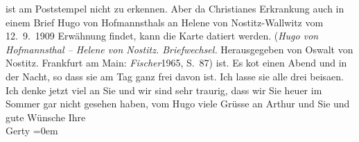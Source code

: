 \begin{ledgroupsized}[t]{13cm}
{{{                        ist am Poststempel nicht zu erkennen. Aber da Christianes Erkrankung auch in einem Brief Hugo von Hofmannsthals an Helene von Nostitz-Wallwitz vom
                            12. 9. 1909 Erwähnung findet, kann die Karte datiert
                        werden. (\emph{Hugo von Hofmannsthal – Helene von Nostitz.
                                Briefwechsel.} Herausgegeben von Oswalt von Nostitz.
                            Frankfurt am Main: \emph{Fischer}1965, S. 87)}}}\label{K_L01871_1h} ist. Es ko{\geminationm}t einen Abend und in der Nacht, so dass sie am
                    Tag ganz frei davon ist. Ich lasse sie alle drei beisa{\geminationm}en. Ich denke jetzt {\pb}viel an Sie und wir sind sehr
                    traurig, dass wir Sie heuer \introOben{}im Sommer\introOben{} gar nicht
                    gesehen haben, vom Hugo viele Grüsse an Arthur und Sie und gute Wünsche\pend
           \pstart
           Ihre{\\[\baselineskip]}\spacefill\mbox{Gerty}\pend
           \leftskip=0em{}          \endnumbering{}\end{ledgroupsized}  \newcommand{\dateiname}{L01871}\newcommand{\titel}{Gerty von Hofmannsthal an Olga Schnitzler, 13. [9.] 1909}\newcommand{\editorInnen}{Martin Anton Müller und Gerd-Hermann Susen}
            \footnotesize
\begin{ledgroupsized}[t]{11.5cm}
\end{ledgroupsized}
         
      